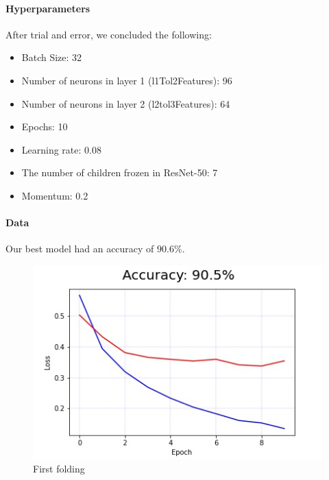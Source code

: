 \documentclass[11pt]{article}
\begin{document}
\paragraph{\noindent\textbf{\LARGE{Hyperparameters}}}
\begin{flushleft}
    After trial and error, we concluded the following:
\begin{itemize}
    \item Batch Size: 32
    \item Number of neurons in layer 1 (l1Tol2Features): 96
    \item Number of neurons in layer 2 (l2tol3Features): 64
    \item Epochs: 10
    \item Learning rate: 0.08
    \item The number of children frozen in ResNet-50: 7
    \item Momentum: 0.2
\end{itemize}    
\end{flushleft} 

\paragraph{\noindent\textbf{\LARGE{Data}}}
\begin{flushleft}
    Our best model had an accuracy of $ 90.6 \% $.
\end{flushleft} 

\begin{figure}[H]
    \centerline{\includegraphics[scale=.5]{image1.jpg}}
    \caption{First folding}
    \label{fig}
\end{figure}
\end{document}
